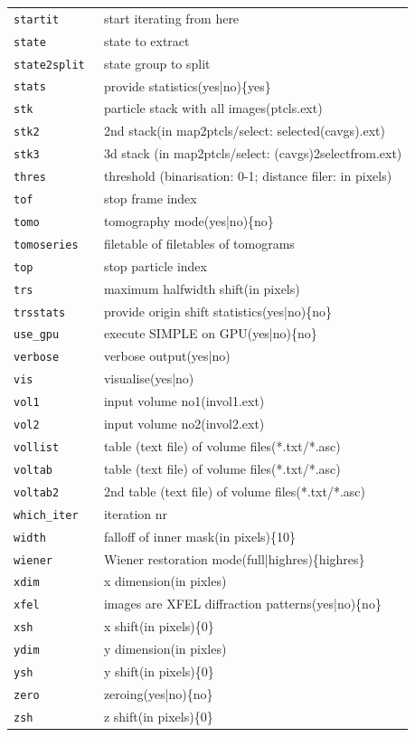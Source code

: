 \documentclass[a4paper,11pt]{article}
\begin{document}
\begin{tabular}{ll}
\texttt{startit      }&{ start iterating from here}\\
\texttt{state        }&{ state to extract}\\
\texttt{state2split  }&{ state group to split}\\
\texttt{stats        }&{ provide statistics(yes|no)\{yes\}}\\
\texttt{stk          }&{ particle stack with all images(ptcls.ext)}\\
\texttt{stk2         }&{ 2nd stack(in map2ptcls/select: selected(cavgs).ext)}\\
\texttt{stk3         }&{ 3d stack (in map2ptcls/select: (cavgs)2selectfrom.ext)}\\
\texttt{thres        }&{ threshold (binarisation: 0-1; distance filer: in pixels)}\\
\texttt{tof          }&{ stop frame index}\\
\texttt{tomo         }&{ tomography mode(yes|no)\{no\}}\\
\texttt{tomoseries   }&{ filetable of filetables of tomograms}\\
\texttt{top          }&{ stop particle index}\\
\texttt{trs          }&{ maximum halfwidth shift(in pixels)}\\
\texttt{trsstats     }&{ provide origin shift statistics(yes|no)\{no\}}\\
\texttt{use\_gpu      }&{ execute SIMPLE on GPU(yes|no)\{no\}}\\
\texttt{verbose      }&{ verbose output(yes|no)}\\
\texttt{vis          }&{ visualise(yes|no)}\\
\texttt{vol1         }&{ input volume no1(invol1.ext)}\\
\texttt{vol2         }&{ input volume no2(invol2.ext)}\\
\texttt{vollist      }&{ table (text file) of volume files(*.txt/*.asc)}\\
\texttt{voltab       }&{ table (text file) of volume files(*.txt/*.asc)}\\
\texttt{voltab2      }&{ 2nd table (text file) of volume files(*.txt/*.asc)}\\
\texttt{which\_iter   }&{ iteration nr}\\
\texttt{width        }&{ falloff of inner mask(in pixels)\{10\}}\\
\texttt{wiener       }&{ Wiener restoration mode(full|highres)\{highres\}}\\
\texttt{xdim         }&{ x dimension(in pixles)}\\
\texttt{xfel         }&{ images are XFEL diffraction patterns(yes|no)\{no\}}\\
\texttt{xsh          }&{ x shift(in pixels)\{0\}}\\
\texttt{ydim         }&{ y dimension(in pixles)}\\
\texttt{ysh          }&{ y shift(in pixels)\{0\}}\\
\texttt{zero         }&{ zeroing(yes|no)\{no\}}\\
\texttt{zsh          }&{ z shift(in pixels)\{0\}}\\
\end{tabular}
\end{document}
